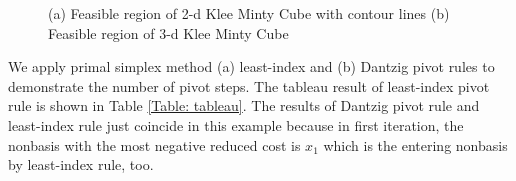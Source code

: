 \documentclass[11pt]{article}
\begin{document}
\begin{figure}
    \centering
    \caption{(a) Feasible region of 2-d Klee Minty Cube with contour lines (b) Feasible region of 3-d Klee Minty Cube}
    \label{fig:kmcube}
\end{figure}
We apply primal simplex method (a) least-index and (b) Dantzig pivot rules to demonstrate the number of pivot steps. The tableau result of least-index pivot rule is shown in Table \ref{Table: tableau}. The results of Dantzig pivot rule and least-index rule just coincide in this example because in first iteration, the nonbasis with the most negative reduced cost is $x_1$ which is the entering nonbasis by least-index rule, too. 
\end{document}
